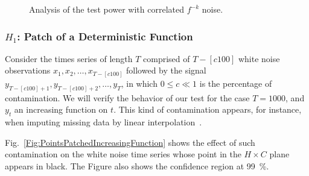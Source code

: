 \documentclass[alpha-refs]{wiley-article}
\begin{document}
\begin{figure}
\centering
{}
\caption{Analysis of the test power with correlated $f^{-k}$ noise.}
\label{fig:correlation}
\end{figure}

\subsubsection{$H_1$: Patch of a Deterministic Function}\label{Sec:PatchDeterministic}

Consider the times series of length $T$ comprised of $T-[c100]$ white noise observations $x_1,x_2,\dots, x_{T-[c100]}$ followed by the signal $y_{T-[c100]+1}, y_{T-[c100]+2}, \dots, y_T$, in which $0\leq c \ll 1$ is the percentage of contamination.
We will verify the behavior of our test for the case $T=1000$, and $y_t$ an increasing function on $t$.
This kind of contamination appears, for instance, when imputing missing data by linear interpolation~\citep{ImputationforConsecutiveMissingValuesinNonStationaryTimeSeriesData}.

Fig.~\ref{Fig:PointsPatchedIncreasingFunction} shows the effect of such contamination on the white noise time series whose point in the $H\times C$ plane appears in black.
The Figure also shows the confidence region at \SI{99}{\percent}.
\end{document}
